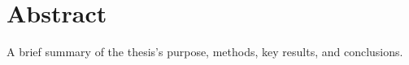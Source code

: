 \chapter*{Abstract}
\label{abstract}

A brief summary of the thesis's purpose, methods, key results, and conclusions.

